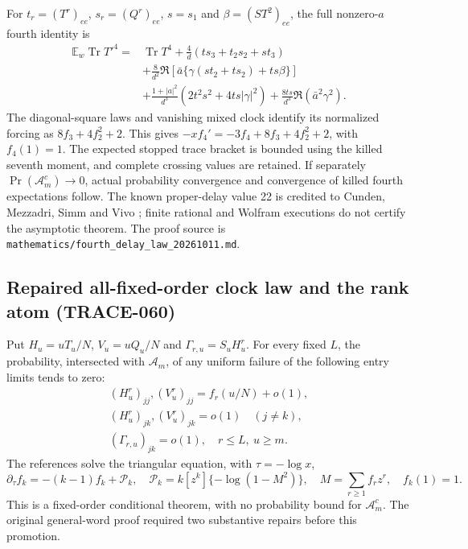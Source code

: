 For $t_r=(T^r)_{ee}$, $s_r=(Q^r)_{ee}$, $s=s_1$ and
$\beta=(ST^2)_{ee}$, the full nonzero-$a$ fourth identity is
\begin{align*}
 \mathbb E_w\operatorname{Tr}T'^4={}&\operatorname{Tr}T^4
 +\frac4d(ts_3+t_2s_2+st_3)\\
 &+\frac8{d^2}\Re\!\left[\bar a\{
       \gamma(st_2+ts_2)+ts\beta\}\right]\\
 &+\frac{1+|a|^2}{d^3}(2t^2s^2+4ts|\gamma|^2)
 +\frac{8ts}{d^3}\Re(\bar a^2\gamma^2).
\end{align*}
The diagonal-square laws and vanishing mixed clock identify its normalized
forcing as $8f_3+4f_2^2+2$. This gives
$-xf_4'=-3f_4+8f_3+4f_2^2+2$, with $f_4(1)=1$.
The expected stopped trace bracket is bounded using the killed seventh
moment, and complete crossing values are retained. If separately
$\Pr(\mathcal A_m^c)\to0$, actual probability convergence and convergence
of killed fourth expectations follow. The known proper-delay value 22 is
credited to Cunden, Mezzadri, Simm and Vivo \cite{CMSV2016Clock}; finite rational and
Wolfram executions do not certify the asymptotic theorem. The proof source
is \texttt{mathematics/fourth\_delay\_law\_20261011.md}.

\subsection{Repaired all-fixed-order clock law and the rank atom (TRACE-060)}
Put $H_u=uT_u/N$, $V_u=uQ_u/N$ and $\Gamma_{r,u}=S_uH_u^r$.
For every fixed $L$, the probability, intersected with $\mathcal A_m$, of
any uniform failure of the following entry limits tends to zero:
\begin{gather*}
 (H_u^r)_{jj},(V_u^r)_{jj}=f_r(u/N)+o(1),\\
 (H_u^r)_{jk},(V_u^r)_{jk}=o(1)\quad(j\ne k),\\
 (\Gamma_{r,u})_{jk}=o(1),\quad r\le L,\ u\ge m.
\end{gather*}
The references solve the triangular equation, with $\tau=-\log x$,
\[
 \partial_\tau f_k=-(k-1)f_k+\mathcal P_k,
 \quad \mathcal P_k=k[z^k]\{-\log(1-M^2)\},\quad
 M=\sum_{r\ge1}f_rz^r,\quad f_k(1)=1.
\]
This is a fixed-order conditional theorem, with no probability bound for
$\mathcal A_m^c$. The original general-word proof required two substantive
repairs before this promotion.

